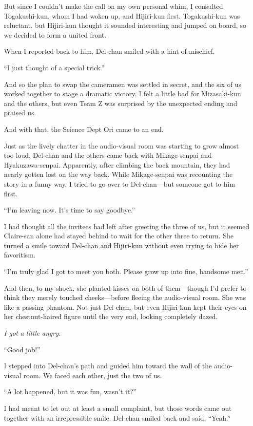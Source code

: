 \documentclass[
    a4paper,
    12pt,
    twoside,
    openany,
    UTF8,
    fontset=windows
]{ctexbook}
\begin{document}
But since I couldn't make the call on my own personal whim, I consulted Togakushi-kun, whom I had woken up, and Hijiri-kun first. Togakushi-kun was reluctant, but Hijiri-kun thought it sounded interesting and jumped on board, so we decided to form a united front.

When I reported back to him, Del-chan smiled with a hint of mischief.

``I just thought of a special trick.''

And so the plan to swap the cameramen was settled in secret, and the six of us worked together to stage a dramatic victory. I felt a little bad for Mizasaki-kun and the others, but even Team Z was surprised by the unexpected ending and praised us.

And with that, the Science Dept Ori came to an end.

Just as the lively chatter in the audio-visual room was starting to grow almost too loud, Del-chan and the others came back with Mikage-senpai and Hyakuzawa-senpai. Apparently, after climbing the back mountain, they had nearly gotten lost on the way back. While Mikage-senpai was recounting the story in a funny way, I tried to go over to Del-chan---but someone got to him first.

``I'm leaving now. It's time to say goodbye.''

I had thought all the invitees had left after greeting the three of us, but it seemed Claire-san alone had stayed behind to wait for the other three to return. She turned a smile toward Del-chan and Hijiri-kun without even trying to hide her favoritism.

``I'm truly glad I got to meet you both. Please grow up into fine, handsome men.''

And then, to my shock, she planted kisses on both of them---though I'd prefer to think they merely touched cheeks---before fleeing the audio-visual room. She was like a passing phantom. Not just Del-chan, but even Hijiri-kun kept their eyes on her chestnut-haired figure until the very end, looking completely dazed.

\textit{I got a little angry.}

``Good job!''

I stepped into Del-chan's path and guided him toward the wall of the audio-visual room. We faced each other, just the two of us.

``A lot happened, but it was fun, wasn't it?''

I had meant to let out at least a small complaint, but those words came out together with an irrepressible smile. Del-chan smiled back and said, ``Yeah.''
\end{document}
